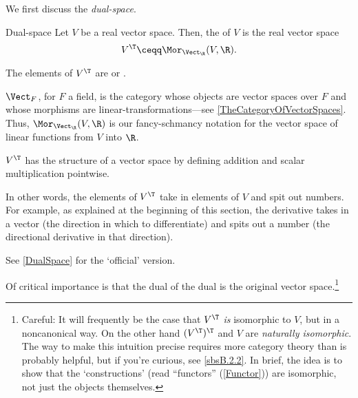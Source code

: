 We first discuss the \emph{dual-space}.
\begin{dfn}{Dual-space}{}
	Let $V$ be a real vector space.  Then, the  of $V$ is the real vector space
	\begin{equation}
	V^{\T}\ceqq \Mor _{\Vect _{\R}}(V,\R ).
	\end{equation}
	\begin{rmk}
		The elements of $V^{\T}$ are  or .
	\end{rmk}
	\begin{rmk}
		$\Vect _F$, for $F$ a field, is the category whose objects are vector spaces over $F$ and whose morphisms are linear-transformations---see \cref{TheCategoryOfVectorSpaces}.  Thus, $\Mor _{\Vect _{\R}}(V,\R )$ is our fancy-schmancy notation for the vector space of linear functions from $V$ into $\R$.
	\end{rmk}
	\begin{rmk}
		$V^{\T}$ has the structure of a vector space by defining addition and scalar multiplication pointwise.
	\end{rmk}
	\begin{rmk}
		In other words, the elements of $V^{\T}$ take in elements of $V$ and spit out numbers.  For example, as explained at the beginning of this section, the derivative takes in a vector (the direction in which to differentiate) and spits out a number (the directional derivative in that direction).
	\end{rmk}
	\begin{rmk}
		See \cref{DualSpace} for the `official' version.
	\end{rmk}
\end{dfn}
Of critical importance is that the dual of the dual is the original vector space.\footnote{Careful:  It will frequently be the case that $V^{\T}$ \emph{is} isomorphic to $V$, but in a noncanonical way.  On the other hand $(V^{\T})^{\T}$ and $V$ are \emph{naturally isomorphic}.  The way to make this intuition precise requires more category theory than is probably helpful, but if you're curious, see \cref{sbsB.2.2}.  In brief, the idea is to show that the `constructions' (read ``functors'' (\cref{Functor})) are isomorphic, not just the objects themselves.}
